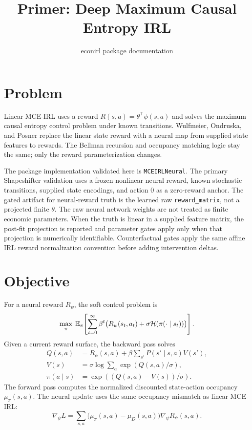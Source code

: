 \documentclass[10pt]{article}
\title{Primer: Deep Maximum Causal Entropy IRL}
\author{econirl package documentation}
\date{}
\begin{document}
\maketitle

\section{Problem}

Linear MCE-IRL \citep{ziebart2010} uses a reward
$R(s,a)=\theta^\top\phi(s,a)$ and solves the maximum causal entropy
control problem under known transitions. Wulfmeier, Ondruska, and Posner
\citep{wulfmeier2015} replace the linear state reward with a neural map
from supplied state features to rewards. The Bellman recursion and
occupancy matching logic stay the same; only the reward parameterization
changes.

The package implementation validated here is \texttt{MCEIRLNeural}. The
primary Shapeshifter validation uses a frozen nonlinear neural reward,
known stochastic transitions, supplied state encodings, and action 0 as a
zero-reward anchor. The gated artifact for neural-reward truth is the
learned raw \texttt{reward\_matrix}, not a projected finite $\theta$. The
raw neural network weights are not treated as finite economic parameters.
When the truth is linear in a supplied feature matrix, the post-fit
projection is reported and parameter gates apply only when that projection
is numerically identifiable. Counterfactual gates apply the same affine IRL
reward normalization convention before adding intervention deltas.

\section{Objective}

\commonnotation

For a neural reward $R_\psi$, the soft control problem is
\begin{equation}
\max_\pi \;
\mathbb{E}_\pi\!\left[
  \sum_{t=0}^{\infty}\beta^t
  \bigl(R_\psi(s_t,a_t) + \sigma \mathcal{H}(\pi(\cdot \mid s_t))\bigr)
\right].
\end{equation}
Given a current reward surface, the backward pass solves
\begin{align}
Q(s,a) &= R_\psi(s,a) + \beta \sum_{s'} P(s' \mid s,a)V(s'), \\
V(s) &= \sigma \log \sum_a \exp(Q(s,a)/\sigma), \\
\pi(a\mid s) &= \exp((Q(s,a)-V(s))/\sigma).
\end{align}
The forward pass computes the normalized discounted state-action occupancy
$\mu_\pi(s,a)$. The neural update uses the same occupancy mismatch as
linear MCE-IRL:
\begin{equation}
\nabla_\psi L
 =
\sum_{s,a} \bigl(\mu_\pi(s,a)-\mu_D(s,a)\bigr)
\nabla_\psi R_\psi(s,a).
\end{equation}
\end{document}
